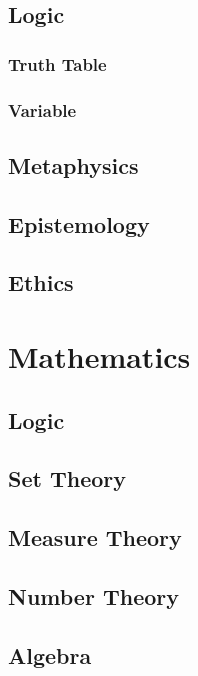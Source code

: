 \documentclass{article}
\begin{document}
\subsection{Logic}
\subsubsection{Truth Table}
\subsubsection{Variable}

\subsection{Metaphysics}

\subsection{Epistemology}

\subsection{Ethics}


\section{Mathematics}

\subsection{Logic}

\subsection{Set Theory}

\subsection{Measure Theory}

\subsection{Number Theory}

\subsection{Algebra}
\end{document}
